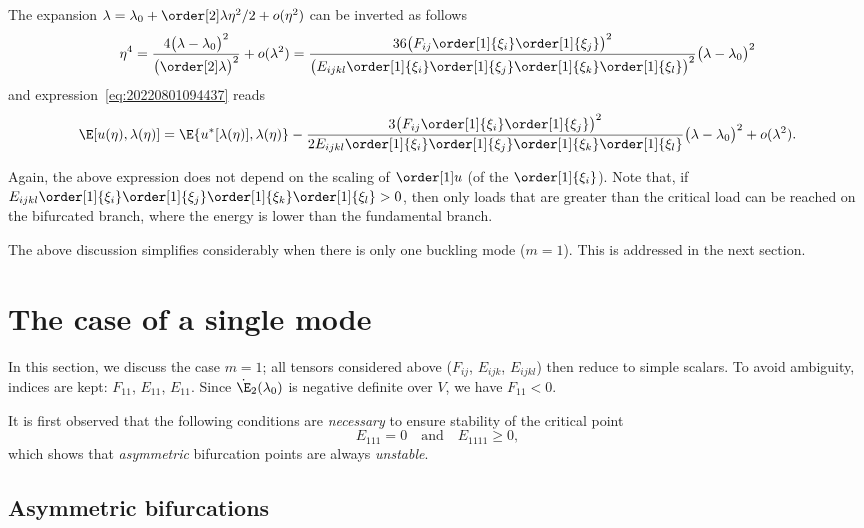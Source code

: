 The expansion $\lambda = \lambda_0 + \order[2]\lambda \eta^2 / 2 + o(\eta^2)$ can be inverted as follows
\begin{equation}
  \eta^4 = \frac{4 \bigl(\lambda - \lambda_0\bigr)^2}{\bigl( \order[2]\lambda \bigr)^2} + o(\lambda^2) = \frac{36 \bigl( F_{ij} \order[1]{\xi_i} \order[1]{\xi_j} \bigr)^2}{\bigl( E_{ijkl} \order[1]{\xi_i} \order[1]{\xi_j} \order[1]{\xi_k} \order[1]{\xi_l} \bigr)^2} \bigl( \lambda - \lambda_0 \bigr)^2
\end{equation}
and expression~\eqref{eq:20220801094437} reads
\begin{equation}
  \E[u(\eta), \lambda(\eta)] = \E\{u^{\ast}[\lambda(\eta)], \lambda(\eta)\} - \frac{3 \bigl( F_{ij} \order[1]{\xi_i} \order[1]{\xi_j} \bigr)^2}{2 E_{ijkl} \order[1]{\xi_i} \order[1]{\xi_j} \order[1]{\xi_k} \order[1]{\xi_l} } \bigl( \lambda - \lambda_0 \bigr)^2  + o(\lambda^2).
\end{equation}

Again, the above expression does not depend on the scaling of $\order[1]u$ (of the $\order[1]{\xi_i}$). Note that, if
$E_{ijkl} \order[1]{\xi_i} \order[1]{\xi_j} \order[1]{\xi_k} \order[1]{\xi_l} > 0$, then only loads that are greater
than the critical load can be reached on the bifurcated branch, where the energy is lower than the fundamental branch.

\medskip

The above discussion simplifies considerably when there is only one buckling mode ($m = 1$). This is addressed in the
next section.

\section{The case of a single mode}

In this section, we discuss the case $m = 1$; all tensors considered above ($F_{ij}$, $E_{ijk}$, $E_{ijkl}$) then reduce
to simple scalars. To avoid ambiguity, indices are kept: $F_{11}$, $E_{11}$, $E_{11}$. Since $\dot{\E}_2(\lambda_0)$ is
negative definite over $V$, we have $F_{11} < 0$.

It is first observed that the following conditions are \emph{necessary} to ensure stability of the critical point
\begin{equation}
  E_{111} = 0 \quad \text{and} \quad E_{1111} \geq 0,
\end{equation}
which shows that \emph{asymmetric} bifurcation points are always
\emph{unstable}.

\subsection{Asymmetric bifurcations}

